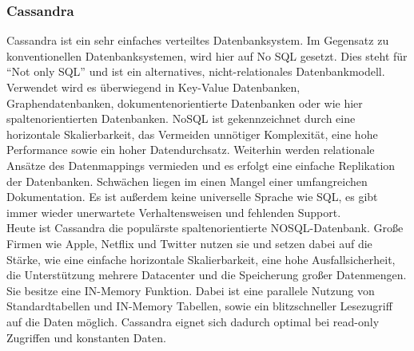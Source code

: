 \documentclass[a4paper, 12pt]{scrartcl}
\begin{document}
\subsubsection{Cassandra}
Cassandra ist ein sehr einfaches verteiltes Datenbanksystem. Im Gegensatz zu konventionellen Datenbanksystemen, wird hier auf No SQL gesetzt. Dies steht für "`Not only SQL"' und ist ein alternatives, nicht-relationales Datenbankmodell. Verwendet wird es überwiegend in Key-Value Datenbanken, Graphendatenbanken, dokumentenorientierte Datenbanken oder wie hier spaltenorientierten Datenbanken. NoSQL ist gekennzeichnet durch eine horizontale Skalierbarkeit, das Vermeiden unnötiger Komplexität, eine hohe Performance sowie ein hoher Datendurchsatz. Weiterhin werden relationale Ansätze des Datenmappings vermieden und es erfolgt eine einfache Replikation der Datenbanken. Schwächen liegen im einen Mangel einer umfangreichen Dokumentation. Es ist außerdem keine universelle Sprache wie SQL, es gibt immer wieder unerwartete Verhaltensweisen und fehlenden Support. \\ Heute ist Cassandra die populärste spaltenorientierte NOSQL-Datenbank. Große Firmen wie Apple, Netflix und Twitter nutzen sie und setzen dabei auf die Stärke, wie eine einfache horizontale Skalierbarkeit, eine hohe Ausfallsicherheit, die Unterstützung mehrere Datacenter und die Speicherung großer Datenmengen.\\ Sie besitze eine IN-Memory Funktion. Dabei ist eine parallele Nutzung von Standardtabellen und IN-Memory Tabellen, sowie ein blitzschneller Lesezugriff auf die Daten möglich. Cassandra eignet sich dadurch optimal bei read-only Zugriffen und konstanten Daten. 
\end{document}
